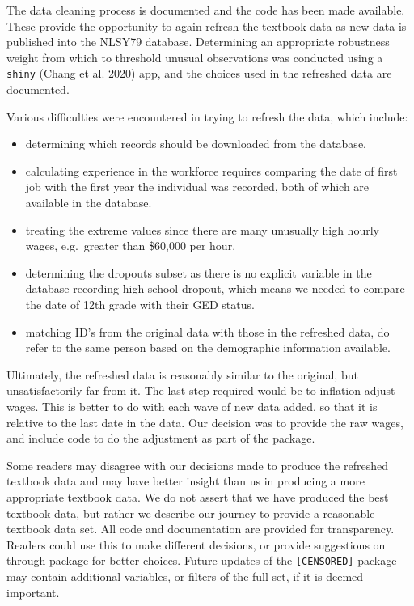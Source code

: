 \documentclass{article}
\begin{document}
The data cleaning process is documented and the code has been made available. These provide the opportunity to again refresh the textbook data as new data is published into the NLSY79 database.
Determining an appropriate robustness weight from which to threshold unusual observations was conducted using a \texttt{shiny} (Chang et al. 2020) app, and the choices used in the refreshed data are documented.

Various difficulties were encountered in trying to refresh the data, which include:

\begin{itemize}
\tightlist
\item
  determining which records should be downloaded from the database.
\item
  calculating experience in the workforce requires comparing the date of first job with the first year the individual was recorded, both of which are available in the database.
\item
  treating the extreme values since there are many unusually high hourly wages, e.g.~greater than \$60,000 per hour.
\item
  determining the dropouts subset as there is no explicit variable in the database recording high school dropout, which means we needed to compare the date of 12th grade with their GED status.
\item
  matching ID's from the original data with those in the refreshed data, do refer to the same person based on the demographic information available.
\end{itemize}

Ultimately, the refreshed data is reasonably similar to the original, but unsatisfactorily far from it. The last step required would be to inflation-adjust wages. This is better to do with each wave of new data added, so that it is relative to the last date in the data. Our decision was to provide the raw wages, and include code to do the adjustment as part of the package.

Some readers may disagree with our decisions made to produce the refreshed textbook data and may have better insight than us in producing a more appropriate textbook data. We do not assert that we have produced the best textbook data, but rather we describe our journey to provide a reasonable textbook data set. All code and documentation are provided for transparency. Readers could use this to make different decisions, or provide suggestions on through package for better choices. Future updates of the \texttt{[CENSORED]} package may contain additional variables, or filters of the full set, if it is deemed important.
\end{document}
